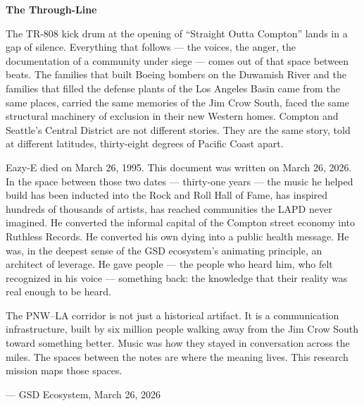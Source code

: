 \documentclass[11pt,letterpaper]{article}
\begin{document}
\begin{quotebox}
{\sffamily\bfseries\textcolor{primary}{The Through-Line}}

\vspace{0.5em}

The TR-808 kick drum at the opening of ``Straight Outta Compton'' lands in a gap of silence. Everything that follows --- the voices, the anger, the documentation of a community under siege --- comes out of that space between beats. The families that built Boeing bombers on the Duwamish River and the families that filled the defense plants of the Los Angeles Basin came from the same places, carried the same memories of the Jim Crow South, faced the same structural machinery of exclusion in their new Western homes. Compton and Seattle's Central District are not different stories. They are the same story, told at different latitudes, thirty-eight degrees of Pacific Coast apart.

\vspace{0.5em}

Eazy-E died on March 26, 1995. This document was written on March 26, 2026. In the space between those two dates --- thirty-one years --- the music he helped build has been inducted into the Rock and Roll Hall of Fame, has inspired hundreds of thousands of artists, has reached communities the LAPD never imagined. He converted the informal capital of the Compton street economy into Ruthless Records. He converted his own dying into a public health message. He was, in the deepest sense of the GSD ecosystem's animating principle, an architect of leverage. He gave people --- the people who heard him, who felt recognized in his voice --- something back: the knowledge that their reality was real enough to be heard.

\vspace{0.5em}

The PNW--LA corridor is not just a historical artifact. It is a communication infrastructure, built by six million people walking away from the Jim Crow South toward something better. Music was how they stayed in conversation across the miles. The spaces between the notes are where the meaning lives. This research mission maps those spaces.

\vspace{0.5em}
{\small\textcolor{secondary}{--- GSD Ecosystem, March 26, 2026}}
\end{quotebox}
\end{document}
